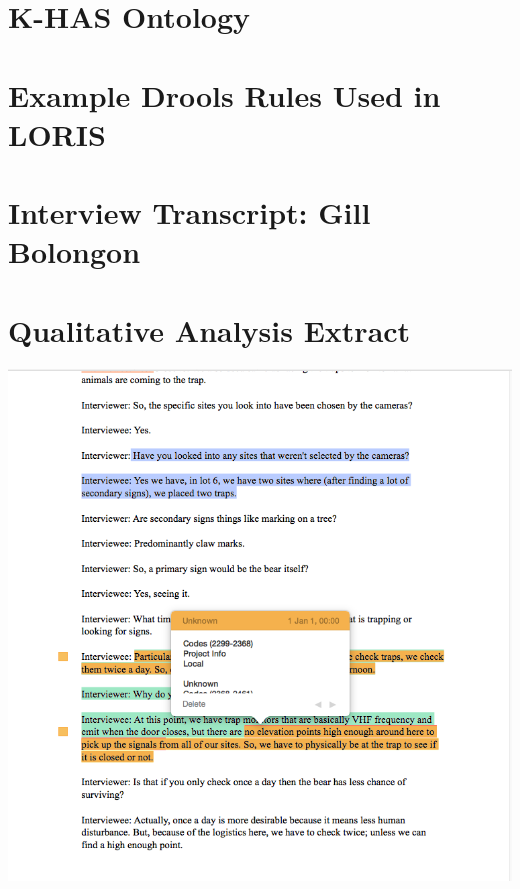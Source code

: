 \begin{appendices}
\chapter{K-HAS Ontology}\label{appendix:ontology}


\chapter{Example Drools Rules Used in LORIS}\label{appendix:drools}


\chapter{Interview Transcript: Gill Bolongon}\label{appendix:interview}


\chapter{Qualitative Analysis Extract}\label{appendix:interview:extract}
\includegraphics[width=\textwidth]{App/figures/roshan_extract}
\end{appendices}